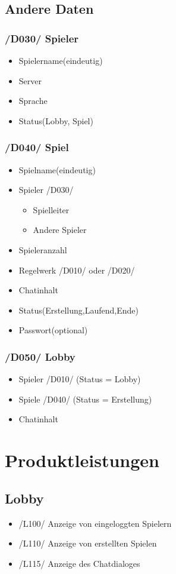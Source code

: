 \documentclass{article}
\begin{document}
\subsection{Andere Daten}
\subsubsection{/D030/ Spieler}
\begin{itemize}
	\item Spielername(eindeutig)
	\item Server
	\item Sprache
	\item Status(\gls{Lobby}, Spiel)
\end{itemize}	

\subsubsection{/D040/ Spiel}
\begin{itemize}
	\item Spielname(eindeutig)
	\item Spieler /D030/
	\begin{itemize}
		\item \gls{Spielleiter}
		\item Andere Spieler
	\end{itemize}
	\item Spieleranzahl
	\item Regelwerk /D010/ oder /D020/
	\item Chatinhalt
	\item Status(Erstellung,Laufend,Ende)
	\item Passwort(optional)
\end{itemize}

\subsubsection{/D050/ \gls{Lobby}}
\begin{itemize}
	\item Spieler /D010/ (Status = \gls{Lobby})
	\item Spiele /D040/ (Status = Erstellung)
	\item Chatinhalt
\end{itemize}

\section{Produktleistungen}
\subsection{\gls{Lobby}}
\begin{itemize}
	\item /L100/ Anzeige von eingeloggten Spielern
	\item /L110/ Anzeige von erstellten Spielen	
	\item /L115/ Anzeige des Chatdialoges		
\end{itemize}
\end{document}
